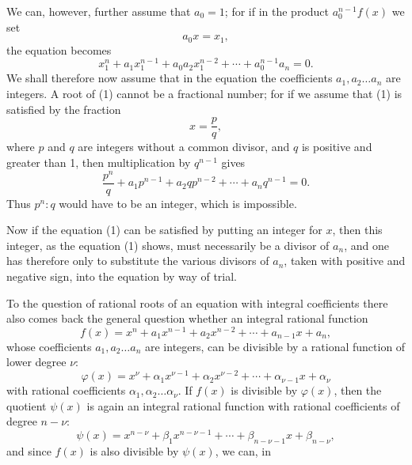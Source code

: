We can, however, further assume that $a_0 = 1$; for if in the product $a_0^{n-1} f(x)$ we set
\[
a_0 x = x_1,
\]
the equation becomes
\[
x_1^n + a_1 x_1^{n-1} + a_0 a_2 x_1^{n-2} + \cdots + a_0^{n-1} a_n = 0.
\]
We shall therefore now assume that in the equation
the coefficients $a_1, a_2 \ldots a_n$ are integers. A  root of (1) cannot be a fractional number; for if we assume that (1) is satisfied by the fraction
\[
x = \frac{p}{q},
\]
where $p$ and $q$ are integers without a common divisor, and $q$ is positive and greater than 1, then multiplication by $q^{n-1}$ gives
\[
\frac{p^n}{q} + a_1 p^{n-1} + a_2 q p^{n-2} + \cdots + a_n q^{n-1} = 0.
\]
Thus $p^n : q$ would have to be an integer, which is impossible.

Now if the equation (1) can be satisfied by putting an integer for $x$, then this integer, as the equation (1) shows, must necessarily be a divisor of $a_n$, and one has therefore only to substitute the various divisors of $a_n$, taken with positive and negative sign, into the equation by way of trial.

To the question of rational roots of an equation with integral coefficients there also comes back the general question whether an integral rational function
\[
f(x) = x^n + a_1 x^{n-1} + a_2 x^{n-2} + \cdots + a_{n-1} x + a_n,
\]
whose coefficients $a_1, a_2 \ldots a_n$ are integers, can be divisible by a rational function of lower degree $\nu$:
\[
\varphi(x) = x^\nu + \alpha_1 x^{\nu-1} + \alpha_2 x^{\nu-2} + \cdots + \alpha_{\nu-1} x + \alpha_\nu
\]
with rational coefficients $\alpha_1, \alpha_2 \ldots \alpha_\nu$. If $f(x)$ is divisible by $\varphi(x)$, then the quotient $\psi(x)$ is again an integral rational function with rational coefficients of degree $n - \nu$:
\[
\psi(x) = x^{n-\nu} + \beta_1 x^{n-\nu-1} + \cdots + \beta_{n-\nu-1} x + \beta_{n-\nu},
\]
and since $f(x)$ is also divisible by $\psi(x)$, we can, in
